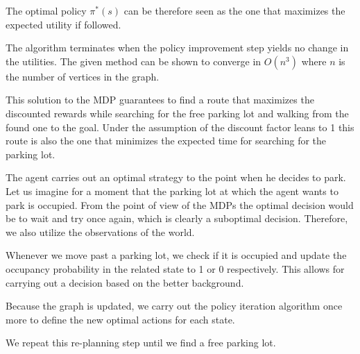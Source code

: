 The optimal policy $\pi^*(s)$ can be therefore seen as the one that maximizes
the expected utility if followed.

The algorithm terminates when the policy improvement step yields no change in
the utilities. The given method can be shown to converge in $O(n^3)$ where $n$
is the number of vertices in the graph.

This solution to the MDP guarantees to find a route that maximizes the
discounted rewards while searching for the free parking lot and walking from
the found one to the goal. Under the assumption of the discount factor leans
to 1 this route is also the one that minimizes the expected time for searching
for the parking lot.

The agent carries out an optimal strategy to the point when he decides to
park. Let us imagine for a moment that the parking lot at which the agent
wants to park is occupied. From the point of view of the MDPs the optimal
decision would be to wait and try once again, which is clearly a suboptimal
decision. Therefore, we also utilize the observations of the world.

Whenever we move past a parking lot, we check if it is occupied and update
the occupancy probability in the related state to 1 or 0 respectively.
This allows for carrying out a decision based on the better background.

Because the graph is updated, we carry out the policy iteration algorithm
once more to define the new optimal actions for each state.

We repeat this re-planning step until we find a free parking lot.

